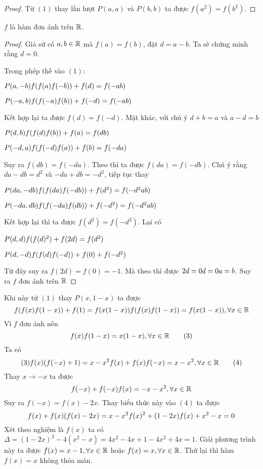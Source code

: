\documentclass[11pt]{scrartcl}
\begin{document}
\begin{itemize}[label=, leftmargin=0em, itemsep=0.5em]
\begin{sol}
\begin{proof}
            Từ $(1)$ thay lần lượt $P(a,a)$ và $P(b,b)$ ta được $f(a^2) = f(b^2)$.
          \end{proof}
          $f$ là hàm đơn ánh trên $\mathbb{R}$.
          \begin{proof}
            Giả sử có $a,b \in \mathbb{R}$ mà $f(a) = f(b)$, đặt $d = a - b$. Ta sẽ chứng minh rằng $d = 0$. 
            
            Trong phép thế vào $(1)$:
    
            $P(a,-b) \ra f(f(a)f(-b)) + f(d) = f(-ab)$ 
    
            $P(-a,b) \ra f(f(-a)f(b)) + f(-d) = f(-ab)$ 
    
            Kết hợp lại ta được $f(d) = f(-d)$. 
            Mặt khác, với chú ý $d + b = a$ và $a - d = b$
    
            $P(d,b) \ra f(f(d)f(b)) + f(a) = f(db)$
    
            $P(-d,a) \ra f(f(-d)f(a)) + f(b) = f(-da)$
    
            Suy ra $f(db) = f(-da)$. Theo  thì ta được $f(da) = f(-db)$. Chú ý rằng $da - db = d^2$ và $ -da + db = -d^2$, tiếp tục thay
    
            $P(da,-db) \ra f(f(da)f(-db)) + f(d^2) = f(-d^2ab)$
    
            $P(-da,db) \ra f(f(-da)f(db)) + f(-d^2) = f(-d^2ab)$
            
            Kết hợp lại thì ta được $f(d^2) = f(-d^2)$. Lại có 
            
            $P(d,d) \ra f(f(d)^2) + f(2d) = f(d^2)$ 
    
            $P(d,-d) \ra f(f(d)f(-d)) + f(0) + f(-d^2)$
    
            Từ đây suy ra $f(2d) = f(0) = - 1$. Mà theo  thì được $2d = 0 \lra d = 0 \lra a = b$. Suy ra $f$ đơn ánh trên $\mathbb{R}$
          \end{proof}
    
          Khi này từ $(1)$ thay $P(x,1-x)$ ta được
          \[
          f(f(x)f(1-x)) + f(1) = f(x(1-x)) \lra f(f(x)f(1 - x)) = f(x(1-x)),\xr
          \]
          Vì $f$ đơn ánh nên \[f(x)f(1-x) = x(1-x),\forall x\in \mathbb{R} \tag{3}\]
          Ta có 
          \[
            (3) \lra f(x)(f(-x) + 1) = x - x^2 \lra f(x) + f(x)f(-x) = x - x^2, \xr\tag{4}
          \]
          Thay $x \to -x$ ta được
          \[
            f(-x) + f(-x)f(x) = -x - x^2, \forall x\in \mathbb{R}
          \]
          Suy ra $f(-x) = f(x) - 2x$. Thay biểu thức này vào $(4)$ ta được
          \[
            f(x) + f(x)(f(x) - 2x) = x - x^2 \lra f(x)^2 + (1 - 2x)f(x) +x^2 - x = 0
          \]
          Xét theo nghiệm là $f(x)$ ta có $\Delta  = (1 - 2x)^2 - 4(x^2 - x) = 4x^2 - 4x + 1 - 4x^2 + 4x = 1$. Giải phương trình này ta được $f(x) = x - 1,\forall x\in \mathbb{R}$ hoặc $f(x) = x,\forall x\in \mathbb{R}$.
          Thử lại thì hàm $f(x) = x$ không thỏa mãn.
          

\end{sol}
\end{itemize}
\end{document}
